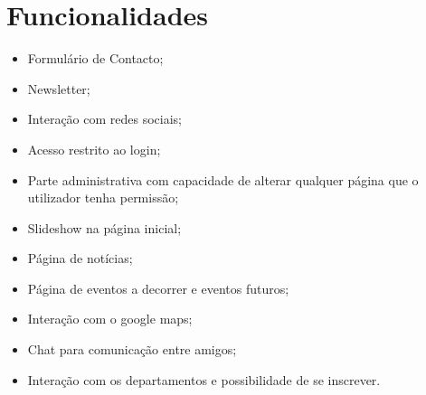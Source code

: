 \documentclass[11pt]{report}
\begin{document}
\section{Funcionalidades}
\begin{itemize}
\item Formulário de Contacto;
\item Newsletter;
\item Interação com redes sociais;
\item Acesso restrito ao login;
\item Parte administrativa com capacidade de alterar qualquer página que o utilizador tenha permissão;
\item Slideshow na página inicial;
\item Página de notícias;
\item Página de eventos a decorrer e eventos futuros;
\item Interação com o google maps;
\item Chat para comunicação entre amigos;
\item Interação com os departamentos e possibilidade de se inscrever.
\end{itemize}
\end{document}
